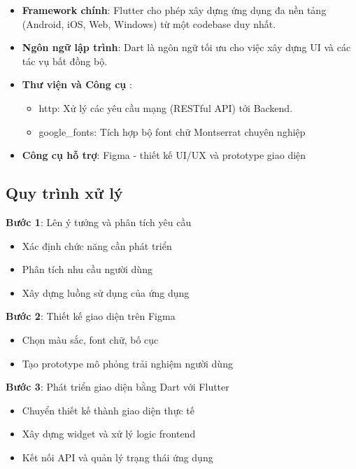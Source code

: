 \begin{itemize}
    \item \textbf{Framework chính}: Flutter cho phép xây dựng ứng dụng đa nền tảng (Android, iOS, Web, Windows) từ một codebase duy nhất.
    \item \textbf{Ngôn ngữ lập trình}: Dart là ngôn ngữ tối ưu cho việc xây dựng UI và các tác vụ bất đồng bộ.
    \item \textbf{Thư viện và Công cụ} \cite{pubdev}:
        \begin{itemize}
            \item http: Xử lý các yêu cầu mạng (RESTful API) tới Backend.
            \item google\_fonts: Tích hợp bộ font chữ Montserrat chuyên nghiệp
        \end{itemize}
    \item \textbf{Công cụ hỗ trợ}: Figma - thiết kế UI/UX và prototype giao diện
\end{itemize}

\subsection{Quy trình xử lý}

\squd \textbf{Bước 1}: Lên ý tưởng và phân tích yêu cầu
\begin{itemize}
    \item Xác định chức năng cần phát triển
    \item Phân tích nhu cầu người dùng
    \item Xây dựng luồng sử dụng của ứng dụng
\end{itemize}

\squd \textbf{Bước 2}: Thiết kế giao diện trên Figma
\begin{itemize}
    \item Chọn màu sắc, font chữ, bố cục
    \item Tạo prototype mô phỏng trải nghiệm người dùng
\end{itemize}

\squd \textbf{Bước 3}: Phát triển giao diện bằng Dart với Flutter
\begin{itemize}
    \item Chuyển thiết kế thành giao diện thực tế
    \item Xây dựng widget và xử lý logic frontend
    \item Kết nối API và quản lý trạng thái ứng dụng
\end{itemize}

